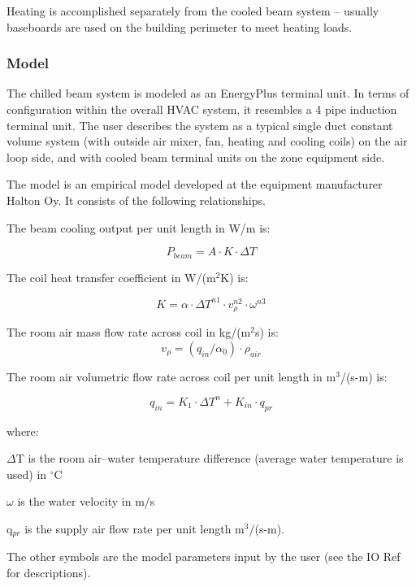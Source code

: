 Heating is accomplished separately from the cooled beam system -- usually baseboards are used on the building perimeter to meet heating loads.

\subsubsection{Model}\label{model-3}

The chilled beam system is modeled as an EnergyPlus terminal unit. In terms of configuration within the overall HVAC system, it resembles a 4 pipe induction terminal unit. The user describes the system as a typical single duct constant volume system (with outside air mixer, fan, heating and cooling coils) on the air loop side, and with cooled beam terminal units on the zone equipment side.

The model is an empirical model developed at the equipment manufacturer Halton Oy. It consists of the following relationships.

The beam cooling output per unit length in W/m is:

\begin{equation}
P_{beam} = A·K·\Delta T
\end{equation}

The coil heat transfer coefficient in W/(m\(^{2}\)K) is:

\begin{equation}
K = \alpha·\Delta T^{n1}·v_{\rho}^{n2}·\omega^{n3}
\end{equation}

The room air mass flow rate across coil in kg/(m\(^{2}\)s) is:
\begin{equation}
v_{\rho} = (q_{in} / \alpha_{0})·\rho_{air}
\end{equation}

The room air volumetric flow rate across coil per unit length in m\(^{3}\)/(s-m) is:

\begin{equation}
q_{in} = K_{1}·\Delta T^{n} + K_{in}·q_{pr}
\end{equation}

where:

\(\Delta\)T is the room air--water temperature difference (average water temperature is used) in \(^{\circ}\)C

\(\omega\) is the water velocity in m/s

q\(_{pr}\) is the supply air flow rate per unit length m\(^{3}\)/(s-m).

The other symbols are the model parameters input by the user (see the IO Ref for descriptions).

